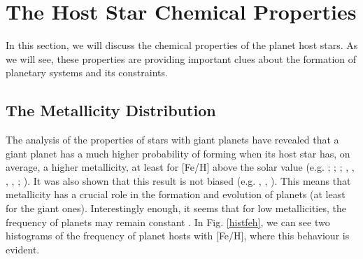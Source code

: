 \documentclass[dvips,12pt,a4paper]{report}
\begin{document}
\section{The Host Star Chemical Properties}

In this section, we will discuss the chemical properties of the planet host stars. As we will see, these properties are providing important clues about the formation of planetary systems and its constraints.

\subsection {The Metallicity Distribution} 
\label{metal}
The analysis of the properties of stars with giant planets have revealed that a giant planet has a much higher probability of forming when its host star has, on average, a higher metallicity, at least for [Fe/H] above the solar value (e.g. \citeauthor{Gonzalez-1998} \citeyear{Gonzalez-1998}; \citeauthor{Gonzalez-2001} \citeyear{Gonzalez-2001}; \citeauthor{Laws-2003} \citeyear{Laws-2003}; \citeauthor{Santos-2001a} \citeyear{Santos-2001b}, \citeyear{Santos-2001a}, \citeyear{Santos-2003}, \citeyear{Santos-2004b}, \citeyear{Santos-2005a}; \citeauthor{Fischer-2005} \citeyear{Fischer-2005}). It was also shown that this result is not biased  (e.g. \citeauthor{Santos-2003} \citeyear{Santos-2003}, \citeyear{Santos-2004b}, \citeauthor{Fischer-2005} \citeyear{Fischer-2005}). This means that metallicity has a crucial role in the formation and evolution of planets (at least for the giant ones). Interestingly enough, it seems that for low metallicities, the frequency of planets may remain constant \citep{Santos-2004b}. In Fig. \ref{histfeh}, we can see two histograms of the frequency of planet hosts with [Fe/H], where this behaviour is evident.
\end{document}
